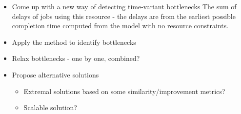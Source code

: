 \begin{itemize}
    \item Come up with a new way of detecting time-variant bottlenecks
        The sum of delays of jobs using this resource - the delays are from the earliest possible completion
        time computed from the model with no resource constraints.

    \item Apply the method to identify bottlenecks
    \item Relax bottlenecks - one by one, combined?
    \item Propose alternative solutions
    \begin{itemize}
        \item Extremal solutions based on some similarity/improvement metrics?
        \item Scalable solution?
    \end{itemize}
\end{itemize}
